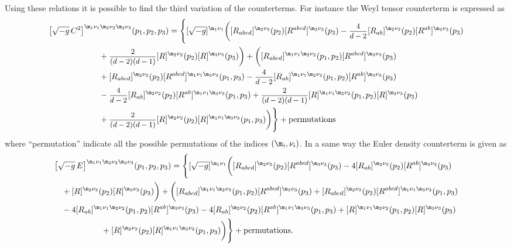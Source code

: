 \documentclass[a4paper,11pt,openright,twoside]{book}
\let\n=\nu      \let\x=\xi     \let\p=\pi      \let\r=\rho
\newcommand{\sdfrac}[2]{\mbox{\small$\displaystyle\frac{#1}{#2}$}}
\numberwithin{equation}{section}
\begin{document}
{{Using these relations it is possible to find the third variation of the counterterms. For instance the Weyl tensor counterterm is expressed as
\begin{align}
	\big[\sqrt{-g}\,C^2\big]^{\m_1\n_1\m_2\n_2\m_3\n_3}(p_1,p_2,p_3)&=\Bigg\{[\sqrt{-g}]^{\m_1\n_1}\bigg([R_{abcd}]^{\m_2\n_2}(p_2)[R^{abcd}]^{\m_3\n_3}(p_3)-\sdfrac{4}{d-2}[R_{ab}]^{\m_2\n_2}(p_2)[R^{ab}]^{\m_3\n_3}(p_3)\notag\\
	&\hspace{-3cm}+\sdfrac{2}{(d-2)(d-1)}[R]^{\m_2\n_2}(p_2)[R]^{\m_3\n_3}(p_3)\bigg)+\bigg([R_{abcd}]^{\m_1\n_1\m_2\n_2}(p_1,p_2)[R^{abcd}]^{\m_3\n_3}(p_3)\notag\\
	&\hspace{-3cm}+[R_{abcd}]^{\m_2\n_2}(p_2)[R^{abcd}]^{\m_1\n_1\m_3\n_3}(p_1,p_3)-\sdfrac{4}{d-2}[R_{ab}]^{\m_1\n_1\m_2\n_2}(p_1,p_2)[R^{ab}]^{\m_3\n_3}(p_3)\notag\\
	&\hspace{-3cm}-\sdfrac{4}{d-2}[R_{ab}]^{\m_2\n_2}(p_2)[R^{ab}]^{\m_1\n_1\m_3\n_3}(p_1,p_3)+\sdfrac{2}{(d-2)(d-1)}[R]^{\m_1\n_1\m_2\n_2}(p_1,p_2)[R]^{\m_3\n_3}(p_3)\notag\\
	&\hspace{-3cm}+\sdfrac{2}{(d-2)(d-1)}[R]^{\m_2\n_2}(p_2)[R]^{\m_1\n_1\m_3\n_3}(p_1,p_3)\bigg)\Bigg\}+\text{permutations}
\end{align}
where ``permutation'' indicate all the possible permutations of the indices $(\m_i,\n_i)$. In a same way the Euler density counterterm is given as
\begin{align}
	\big[\sqrt{-g}\,E\big]^{\m_1\n_1\m_2\n_2\m_3\n_3}(p_1,p_2,p_3)&=\Bigg\{[\sqrt{-g}]^{\m_1\n_1}\bigg([R_{abcd}]^{\m_2\n_2}(p_2)[R^{abcd}]^{\m_3\n_3}(p_3)-4[R_{ab}]^{\m_2\n_2}(p_2)[R^{ab}]^{\m_3\n_3}(p_3)\notag\\
	&\hspace{-4.7cm}+[R]^{\m_2\n_2}(p_2)[R]^{\m_3\n_3}(p_3)\bigg)+\bigg([R_{abcd}]^{\m_1\n_1\m_2\n_2}(p_1,p_2)[R^{abcd}]^{\m_3\n_3}(p_3)+[R_{abcd}]^{\m_2\n_2}(p_2)[R^{abcd}]^{\m_1\n_1\m_3\n_3}(p_1,p_3)\notag\\
	&\hspace{-4.7cm}-4[R_{ab}]^{\m_1\n_1\m_2\n_2}(p_1,p_2)[R^{ab}]^{\m_3\n_3}(p_3)-4[R_{ab}]^{\m_2\n_2}(p_2)[R^{ab}]^{\m_1\n_1\m_3\n_3}(p_1,p_3)+[R]^{\m_1\n_1\m_2\n_2}(p_1,p_2)[R]^{\m_3\n_3}(p_3)\notag\\
	&\hspace{-3cm}+[R]^{\m_2\n_2}(p_2)[R]^{\m_1\n_1\m_3\n_3}(p_1,p_3)\bigg)\Bigg\}+\text{permutations}.
\end{align}
}}
\end{document}
